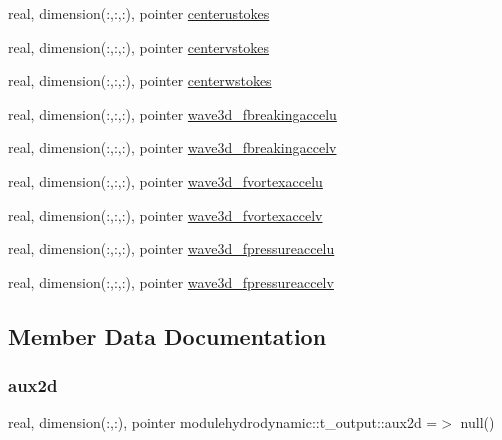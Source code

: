 \begin{DoxyCompactItemize}
\item 
real, dimension(\+:,\+:,\+:), pointer \mbox{\hyperlink{structmodulehydrodynamic_1_1t__output_a95082d07929df4b986028d492eb359a8}{centerustokes}}
\item 
real, dimension(\+:,\+:,\+:), pointer \mbox{\hyperlink{structmodulehydrodynamic_1_1t__output_a72c9ec5b7aa0082b0a7e32cf9354a962}{centervstokes}}
\item 
real, dimension(\+:,\+:,\+:), pointer \mbox{\hyperlink{structmodulehydrodynamic_1_1t__output_a55e4960a8493cac335c8d9fbd0326bcb}{centerwstokes}}
\item 
real, dimension(\+:,\+:,\+:), pointer \mbox{\hyperlink{structmodulehydrodynamic_1_1t__output_a66e72ee1c56db4535d29e1951be331a2}{wave3d\+\_\+fbreakingaccelu}}
\item 
real, dimension(\+:,\+:,\+:), pointer \mbox{\hyperlink{structmodulehydrodynamic_1_1t__output_aaf8bf3a5782e7fc1109360e0acdd2d36}{wave3d\+\_\+fbreakingaccelv}}
\item 
real, dimension(\+:,\+:,\+:), pointer \mbox{\hyperlink{structmodulehydrodynamic_1_1t__output_a93ae2d4a04eb274212cede4e96160d58}{wave3d\+\_\+fvortexaccelu}}
\item 
real, dimension(\+:,\+:,\+:), pointer \mbox{\hyperlink{structmodulehydrodynamic_1_1t__output_a0c62ade5517582998383e3ee4ab813f0}{wave3d\+\_\+fvortexaccelv}}
\item 
real, dimension(\+:,\+:,\+:), pointer \mbox{\hyperlink{structmodulehydrodynamic_1_1t__output_aa228d34a1b1ff4e68def2d6ad1e1aa7c}{wave3d\+\_\+fpressureaccelu}}
\item 
real, dimension(\+:,\+:,\+:), pointer \mbox{\hyperlink{structmodulehydrodynamic_1_1t__output_a1794de3004f7cb2192f2efaf456cc709}{wave3d\+\_\+fpressureaccelv}}
\end{DoxyCompactItemize}


\subsection{Member Data Documentation}
\mbox{\label{structmodulehydrodynamic_1_1t__output_a3ece9bdb1da8040fc1c39e56aa85b0bf}} 
\subsubsection{\texorpdfstring{aux2d}{aux2d}}
{\footnotesize\ttfamily real, dimension(\+:,\+:), pointer modulehydrodynamic\+::t\+\_\+output\+::aux2d =$>$ null()\hspace{0.3cm}{\ttfamily [private]}}

